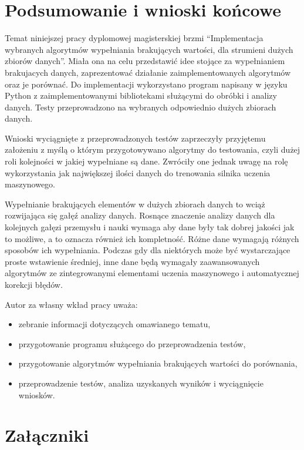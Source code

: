 \documentclass[12pt,twoside]{article}
\begin{document}
\clearpage
\section{Podsumowanie i wnioski końcowe}
Temat niniejszej pracy dyplomowej magisterskiej brzmi ``Implementacja wybranych algorytmów wypełniania brakujących wartości,
dla strumieni dużych zbiorów danych''. Miała ona na celu przedstawić idee stojące za wypełnianiem brakujacych danych,
zaprezentować działanie zaimplementowanych algorytmów oraz je porównać. Do implementacji wykorzystano program
napisany w języku Python z zaimplementowanymi bibliotekami służącymi do obróbki i analizy danych. Testy przeprowadzono
na wybranych odpowiednio dużych zbiorach danych.

Wnioski wyciągnięte z przeprowadzonych testów zaprzeczyły przyjętemu założeniu z myślą o którym przygotowywano
algorytmy do testowania, czyli dużej roli kolejności w jakiej wypełniane są dane. Zwróciły one jednak uwagę na
rolę wykorzystania jak największej ilości danych do trenowania silnika uczenia maszynowego.

Wypełnianie brakujących elementów w dużych zbiorach danych to wciąż rozwijająca się gałęź analizy danych.
Rosnące znaczenie analizy danych dla kolejnych gałęzi przemysłu i nauki wymaga aby dane były tak dobrej jakości
jak to możliwe, a to oznacza również ich kompletność.
Różne dane wymagają różnych sposobów ich wypełniania.
Podczas gdy dla niektórych może być wystarczające proste wstawienie średniej, inne dane będą wymagały zaawansowanych
algorytmów ze zintegrowanymi elementami uczenia maszynowego i automatycznej korekcji błędów.

Autor za własny wkład pracy uważa:
\begin{itemize}[label=-,labelsep=0.4cm, leftmargin=1.25cm]
    \item zebranie informacji dotyczących omawianego tematu,
    \item przygotowanie programu służącego do przeprowadzenia testów,
    \item przygotowanie algorytmów wypełniania brakujących wartości do porównania,
    \item przeprowadzenie testów, analiza uzyskanych wyników i wyciągnięcie wniosków.
\end{itemize}


\clearpage
\section*{Załączniki}
\end{document}
